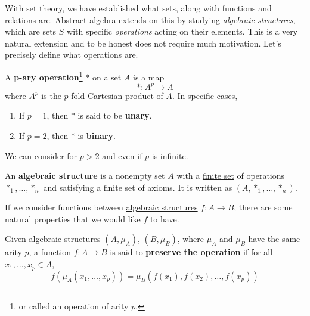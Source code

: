 With set theory, we have established what sets, along with functions and relations are. Abstract algebra extends on this by studying \textit{algebraic structures}, which are sets $S$ with specific \textit{operations} acting on their elements. This is a very natural extension and to be honest does not require much motivation. Let's precisely define what operations are. 

\begin{definition}[Operation]
  \label{def:operation}
  A \textbf{p-ary operation}\footnote{or called an operation of arity $p$.} $\ast$ on a set $A$ is a map 
  \begin{equation}
    \ast : A^p \to A
  \end{equation} 
  where $A^p$ is the $p$-fold \hyperref[st-def:cart-prod-2]{Cartesian product} of $A$. In specific cases, 
  \begin{enumerate}
    \item If $p = 1$, then $\ast$ is said to be \textbf{unary}. 
    \item If $p = 2$, then $\ast$ is \textbf{binary}. 
  \end{enumerate}
  We can consider for $p > 2$ and even if $p$ is infinite.  
\end{definition}

\begin{definition}
  \label{def:algebraic-structure}
  An \textbf{algebraic structure} is a nonempty set $A$ with a \hyperref[st-def:finite-set]{finite set} of operations $\ast_1, \ldots, \ast_n$ and satisfying a finite set of axioms. It is written as $(A, \ast_1, \ldots, \ast_n)$. 
\end{definition} 

If we consider functions between \hyperref[def:algebraic-structure]{algebraic structures} $f: A \rightarrow B$, there are some natural properties that we would like $f$ to have. 

\begin{definition}
  \label{def:preservation-of-operation}
  Given \hyperref[def:algebraic-structure]{algebraic structures} $(A, \mu_A)$, $(B, \mu_B)$, where $\mu_A$ and $\mu_B$ have the same arity $p$, a function $f: A \rightarrow B$ is said to \textbf{preserve the operation} if for all $x_1, \ldots, x_p \in A$, 
  \begin{equation}
    f(\mu_A(x_1, \ldots, x_p)) = \mu_B (f(x_1), f(x_2), \ldots, f(x_p))
  \end{equation}
\end{definition} 

